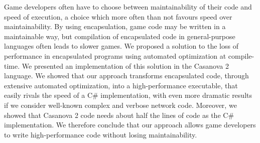 Game developers often have to choose between maintainability of their code and speed of execution, a choice which more often than not favours speed over maintainability. By using encapsulation, game code may be written in a maintainable way, but compilation of encapsulated code in general-purpose languages often leads to slower games. We proposed a solution to the loss of performance in encapsulated programs using automated optimization at compile-time. 
We presented an implementation of this solution in the Casanova 2 language. We showed that our approach transforms encapsulated code, through extensive automated optimization, into a high-performance executable, that easily rivals the speed of a C\# implementation, with even more dramatic results if we consider well-known complex and verbose network code. Moreover, we showed that Casanova 2 code needs about half the lines of code as the C\# implementation. We therefore conclude that our approach allows game developers to write high-performance code without losing maintainability.




